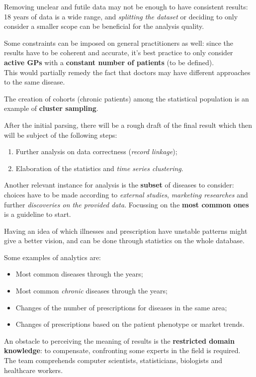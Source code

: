 Removing unclear and futile data may not be enough to have consistent results: 18 years of data is a wide range, and \textit{splitting the dataset} or deciding to only consider a smaller scope can be beneficial for the analysis quality. 

Some constraints can be imposed on general practitioners as well: since the results have to be coherent and accurate, it's best practice to only consider \textbf{active GPs} with a \textbf{constant number of patients} (to be defined). \\ This would partially remedy the fact that doctors may have different approaches to the same disease.

The creation of cohorts (chronic patients) among the statistical population is an example of \textbf{cluster sampling}.

After the initial parsing, there will be a rough draft of the final result which then will be subject of the following steps:
\begin{enumerate}
	\item Further analysis on data correctness (\textit{record linkage});
	\item Elaboration of the statistics and \textit{time series clustering}.
\end{enumerate}

Another relevant instance for analysis is the \textbf{subset} of diseases to consider: choices have to be made according to \textit{external studies}, \textit{marketing researches} and further \textit{discoveries on the provided data}. Focussing on the \textbf{most common ones} is a guideline to start.

Having an idea of which illnesses and prescription have unstable patterns might give a better vision, and can be done through statistics on the whole database. 

Some examples of analytics are:
\begin{itemize}
	\item Most common diseases through the years;
	\item Most common \textit{chronic} diseases through the years;
	\item Changes of the number of prescriptions for diseases in the same area;
	\item Changes of prescriptions based on the patient phenotype or market trends.
\end{itemize}

An obstacle to perceiving the meaning of results is the \textbf{restricted domain knowledge}: to compensate, confronting some experts in the field is required. The team comprehends computer scientists, statisticians, biologists and healthcare workers.

